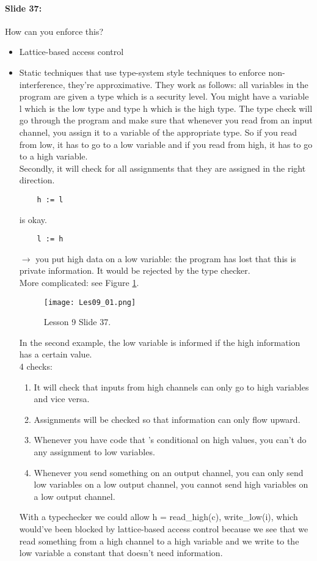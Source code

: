\documentclass[10pt,a4paper]{report}
\begin{document}
\paragraph{Slide 37:} How can you enforce this? 
\begin{itemize}
\item Lattice-based access control
\item Static techniques that use type-system style techniques to enforce non-interference, they're approximative. They work as follows: all variables in the program are given a type which is a security level. You might have a variable l which is the low type and type h which is the high type. The type check will go through the program and make sure that whenever you read from an input channel, you assign it to a variable of the appropriate type. So if you read from low, it has to go to a low variable and if you read from high, it has to go to a high variable.\\
Secondly, it will check for all assignments that they are assigned in the right direction.
\begin{verbatim}
	h := l
\end{verbatim} is okay.
\begin{verbatim}
	l := h
\end{verbatim} $\rightarrow$ you put high data on a low variable: the program has lost that this is private information. It would be rejected by the type checker.\\
More complicated: see Figure \ref{les09_01}.

\begin{figure}[ht!]
\centering
\texttt{[image: Les09\_01.png]}
\caption{Lesson 9 Slide 37.} 
\label{les09_01}
\end{figure}
	
In the second example, the low variable is informed if the high information has a certain value.\\
4 checks:
\begin{enumerate}
\item It will check that inputs from high channels can only go to high variables and vice versa.
\item Assignments will be checked so that information can only flow upward.	
\item Whenever you have code that 's conditional on high values, you can't do any assignment to low variables. 
\item Whenever you send something on an output channel, you can only send low variables on a low output channel, you cannot send high variables on a low output channel.
\end{enumerate}	
With a typechecker we could allow h = read\_high(c), write\_low(i), which would've been blocked by lattice-based access control because we see that we read something from a high channel to a high variable and we write to the low variable a constant that doesn't need information.
\end{itemize}
\end{document}
